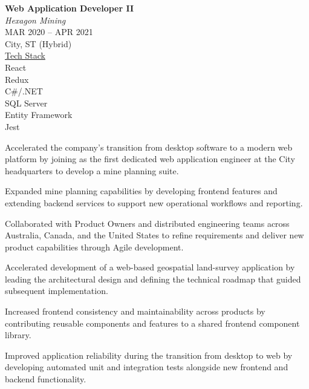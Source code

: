 \documentclass[10pt]{article}
\newcommand{\jobmeta}[5]{%
  \textbf{#1}\\
  \textit{#2}\\[4pt]
  {\color{lighttext}#3}\\
  {\color{lighttext}#4}\\[4pt]
  {\underline{\color{lighttext}Tech Stack}}\\
  {\color{lighttext}#5}%
}
\begin{document}
\begin{entryrow}
  {\jobmeta
    {Web Application Developer II}
    {Hexagon Mining}
    {MAR 2020 -- APR 2021}
    {City, ST (Hybrid)}
    {
      React\\
      Redux\\
      C\#/.NET\\
      SQL Server\\
      Entity Framework \\
      Jest
    }
  }
  \begin{resumeitems}
    \item Accelerated the company's transition from desktop software to a modern web platform by joining as the first dedicated web application engineer at the City headquarters to develop a mine planning suite.
    \item Expanded mine planning capabilities by developing frontend features and extending backend services to support new operational workflows and reporting.
    \item Collaborated with Product Owners and distributed engineering teams across Australia, Canada, and the United States to refine requirements and deliver new product capabilities through Agile development.
    \item Accelerated development of a web-based geospatial land-survey application by leading the architectural design and defining the technical roadmap that guided subsequent implementation.
    \item Increased frontend consistency and maintainability across products by contributing reusable components and features to a shared frontend component library.
    \item Improved application reliability during the transition from desktop to web by developing automated unit and integration tests alongside new frontend and backend functionality.
  \end{resumeitems}
\end{entryrow}
\end{document}
